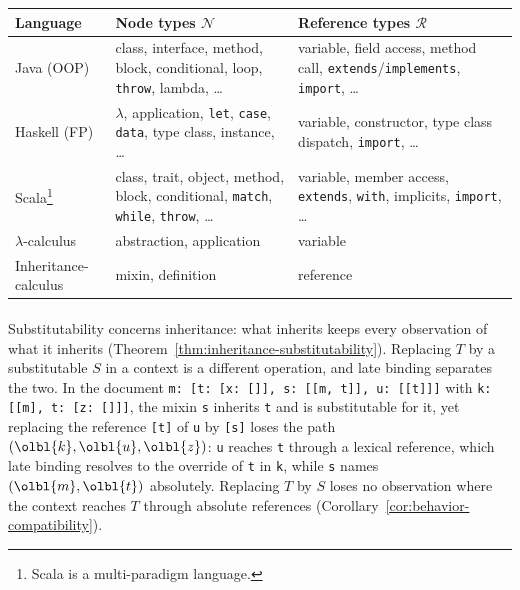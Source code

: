 \begin{CJK*}{UTF8}{gbsn}
{\small\typewriterInlineCodeInHtml
  \begin{center}
    \begin{tabular}{L{0.2\columnwidth}L{0.36\columnwidth}L{0.32\columnwidth}}
      \textbf{Language}
      & \textbf{Node types $\mathcal{N}$}
      & \textbf{Reference types $\mathcal{R}$} \\
      \hline
      Java (OOP)
      & class, interface, method,
      block, conditional, loop,
      \texttt{throw}, lambda, \ldots
      & variable, field access, method call,
      \texttt{extends}/\texttt{implements},
      \texttt{import}, \ldots \\[3pt]
      Haskell (FP)
      & $\lambda$, application, \texttt{let},
      \texttt{case}, \texttt{data},
      type class, instance, \ldots
      & variable, constructor,
      type class dispatch,
      \texttt{import}, \ldots \\[3pt]
      Scala\footnote{
        Scala is a multi-paradigm language.
      }
      & class, trait, object, method,
      block, conditional, \texttt{match},
      \texttt{while}, \texttt{throw}, \ldots
      & variable, member access,
      \texttt{extends}, \texttt{with},
      implicits, \texttt{import}, \ldots \\
      \hline
      $\lambda$-calculus
      & abstraction, application
      & variable \\
      Inheritance-calculus
      & mixin, definition
      & reference \\
    \end{tabular}
  \end{center}
}


\paragraph{}
Substitutability concerns inheritance: what inherits keeps every observation of what it inherits
(Theorem~\ref{thm:inheritance-substitutability}).
Replacing $T$ by a substitutable $S$ in a context is a different operation, and late binding separates
the two.
In the document \texttt{m: [t: [x: []], s: [[m, t]], u: [[t]]]} with
\texttt{k: [[m], t: [z: []]]}, the mixin \texttt{s} inherits
\texttt{t} and is substitutable for it, yet replacing the reference
\texttt{[t]} of \texttt{u} by \texttt{[s]} loses the path
$(\olbl{k}, \olbl{u}, \olbl{z})$: \texttt{u} reaches \texttt{t} through a
lexical reference, which late binding resolves to the override of \texttt{t} in
\texttt{k}, while \texttt{s} names $(\olbl{m}, \olbl{t})$ absolutely.
Replacing $T$ by $S$ loses no observation where the context reaches $T$ through absolute references
(Corollary~\ref{cor:behavior-compatibility}).


\end{CJK*}
